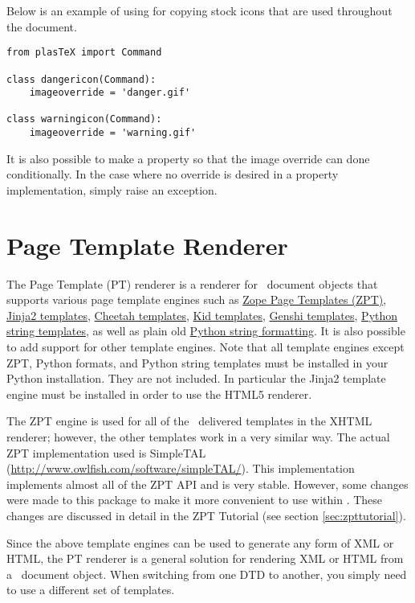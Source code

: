 Below is an example of using  for copying
stock icons that are used throughout the document.
\begin{verbatim}
from plasTeX import Command

class dangericon(Command):
    imageoverride = 'danger.gif'

class warningicon(Command):
    imageoverride = 'warning.gif'
\end{verbatim}

It is also possible to make  a property
so that the image override can done conditionally.  In the case
where no override is desired in a property implementation, simply
raise an  exception.

\section{Page Template Renderer\label{sec:zpt}}

The Page Template (PT) renderer is a renderer for \plasTeX\ document
objects that supports various page template engines such as
\href{http://www.zope.org/Documentation/Books/ZopeBook/2_6Edition/ZPT.stx}{Zope
Page Templates (ZPT)}, \href{http://jinja.pocoo.org/}{Jinja2 templates},
\href{http://www.cheetahtemplate.org/}{Cheetah templates},
\href{http://kid-templating.org/}{Kid templates},
\href{http://genshi.edgewall.org/}{Genshi templates},
\href{http://docs.python.org/lib/node40.html}{Python string templates},
as well as plain old \href{http://docs.python.org/lib/typesseq-strings.html}{Python string formatting}.  It is also possible to add support for other
template engines.  Note that all template engines except ZPT, Python formats,
and Python string templates must be installed in your Python installation.
They are not included. In particular the Jinja2 template engine must be
installed in order to use the HTML5 renderer.

The ZPT engine is used for all of the \plasTeX\ delivered templates
in the XHTML renderer; however, the other templates work in a very similar way.
The actual ZPT implementation used is SimpleTAL
(\url{http://www.owlfish.com/software/simpleTAL/}).  This implementation
implements almost all of the ZPT API and is very stable.  However, some
changes were made to this package to make it more convenient to use
within \plasTeX.  These changes are discussed in detail in the
ZPT Tutorial (see section \ref{sec:zpttutorial}).

Since the above template engines can be used to generate any form of
XML or HTML, the PT
renderer is a general solution for rendering XML or HTML from a
\plasTeX\ document object.  When switching from one DTD to another,
you simply need to use a different set of templates.

